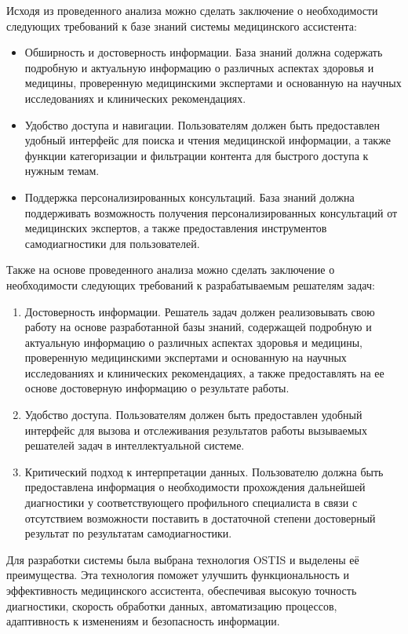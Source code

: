 Исходя из проведенного анализа можно сделать заключение о необходимости следующих требований к базе знаний системы медицинского ассистента:

\begin{itemize}
    \item Обширность и достоверность информации. База знаний должна содержать подробную и актуальную информацию о различных аспектах здоровья и медицины, проверенную медицинскими экспертами и основанную на научных исследованиях и клинических рекомендациях.
    \item Удобство доступа и навигации. Пользователям должен быть предоставлен удобный интерфейс для поиска и чтения медицинской информации, а также функции категоризации и фильтрации контента для быстрого доступа к нужным темам.
    \item Поддержка персонализированных консультаций. База знаний должна поддерживать возможность получения персонализированных консультаций от медицинских экспертов, а также предоставления инструментов самодиагностики для пользователей.
\end{itemize}

Также на основе проведенного анализа можно сделать заключение о необходимости следующих требований к разрабатываемым решателям задач:

\begin{enumerate}[label=\arabic*)]
    \item Достоверность информации. Решатель задач должен реализовывать свою работу на основе разработанной базы знаний, содержащей подробную и актуальную информацию о различных аспектах здоровья и медицины, проверенную медицинскими экспертами и основанную на научных исследованиях и клинических рекомендациях, а также предоставлять на ее основе достоверную информацию о результате работы.
    \item Удобство доступа. Пользователям должен быть предоставлен удобный интерфейс для вызова и отслеживания результатов работы вызываемых решателей задач в интеллектуальной системе.
    \item Критический подход к интерпретации данных. Пользователю должна быть предоставлена информация о необходимости прохождения дальнейшей диагностики у соответствующего профильного специалиста в связи с отсутствием возможности поставить в достаточной степени достоверный результат по результатам самодиагностики.
\end{enumerate}

Для разработки системы была выбрана технология OSTIS и выделены её преимущества. Эта технология поможет улучшить функциональность и эффективность медицинского ассистента, обеспечивая высокую точность диагностики, скорость обработки данных, автоматизацию процессов, адаптивность к изменениям и безопасность информации.


